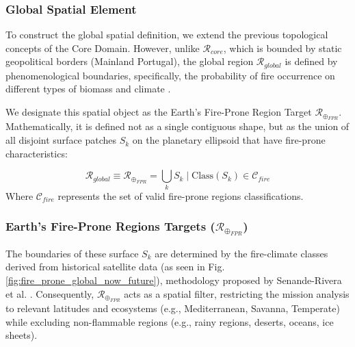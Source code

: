 \subsubsection{Global Spatial Element}

To construct the global spatial definition, we extend the previous topological concepts of the Core Domain. However, unlike $\mathcal{R}_{core}$, which is bounded by static geopolitical borders (Mainland Portugal), the global region $\mathcal{R}_{global}$ is defined by phenomenological boundaries, specifically, the probability of fire occurrence on different types of biomass and climate .

We designate this spatial object as the Earth's Fire-Prone Region Target\textbf{ $\mathcal{R}_{\oplus_{FPR}}$}. Mathematically, it is defined not as a single contiguous shape, but as the union of all disjoint surface patches $S_k$ on the planetary ellipsoid that have fire-prone characteristics:

\begin{equation}
    \mathcal{R}_{global} \equiv \mathcal{R}_{\oplus_{FPR}} = \bigcup_{k} S_k  \mid  \text{Class}(S_k) \in \mathcal{C}_{fire}
\end{equation}
Where $\mathcal{C}_{fire}$ represents the set of valid fire-prone regions classifications.

\subsubsection{Earth's Fire-Prone Regions Targets ($\mathcal{R}_{\oplus_{FPR}}$)} \hspace{0pt}
\label{sec:earths_frp_targets}

The boundaries of these surface $S_k$ are determined by the fire-climate classes derived from historical satellite data (as seen in Fig. \ref{fig:fire_prone_global_now_future}), methodology proposed by Senande-Rivera et al. \cite{senande-rivera_spatial_2022}. Consequently, $\mathcal{R}_{\oplus_{FPR}}$ acts as a spatial filter, restricting the mission analysis to relevant latitudes and ecosystems (e.g., Mediterranean, Savanna, Temperate) while excluding non-flammable regions (e.g., rainy regions, deserts, oceans, ice sheets). 

